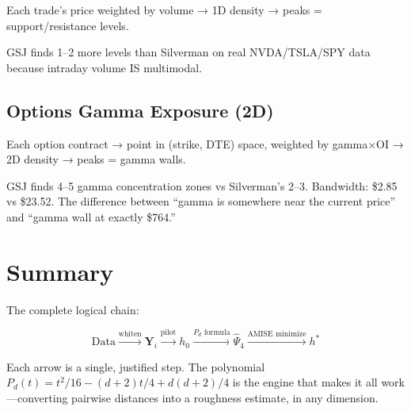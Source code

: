 \documentclass[12pt]{article}
\begin{document}
Each trade's price weighted by volume → 1D density → peaks = support/resistance levels.

GSJ finds 1--2 more levels than Silverman on real NVDA/TSLA/SPY data because intraday volume IS multimodal.

\subsection{Options Gamma Exposure (2D)}

Each option contract → point in (strike, DTE) space, weighted by gamma$\times$OI → 2D density → peaks = gamma walls.

GSJ finds 4--5 gamma concentration zones vs Silverman's 2--3. Bandwidth: \$2.85 vs \$23.52. The difference between ``gamma is somewhere near the current price'' and ``gamma wall at exactly \$764.''

\section{Summary}

The complete logical chain:

$$\text{Data} \xrightarrow{\text{whiten}} \mathbf{Y}_i \xrightarrow{\text{pilot}} h_0 \xrightarrow{P_d\text{ formula}} \hat\Psi_4 \xrightarrow{\text{AMISE minimize}} h^*$$

Each arrow is a single, justified step. The polynomial $P_d(t) = t^2/16 - (d+2)t/4 + d(d+2)/4$ is the engine that makes it all work---converting pairwise distances into a roughness estimate, in any dimension.
\end{document}
